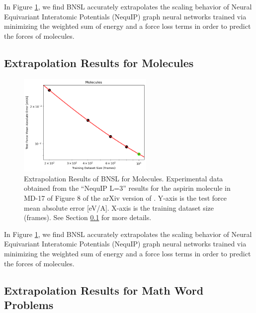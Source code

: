 \documentclass{article} %
\begin{document}
In Figure \ref{fig:molecules}, we find BNSL accurately extrapolates the scaling behavior of Neural Equivariant Interatomic Potentials (NequIP) graph neural networks \citep{Batzner_2022} trained via minimizing the weighted sum of energy and a force loss terms in order to predict the forces of molecules. 
\fi

\subsection{Extrapolation Results for Molecules}
\label{section:molecules}

\begin{figure}[htbp]
    \centering
\includegraphics[width=0.58\textwidth]{figures/molecules/molecules.png}
    \caption{
Extrapolation Results of BNSL for Molecules. Experimental data obtained from the ``NequIP L=3'' results for the aspirin molecule in MD-17 of Figure 8 of the arXiv version of \cite{Batzner_2022}. Y-axis is the test force mean absolute error [eV/A]. X-axis is the training dataset size (frames). See Section \ref{section:molecules} for more details.
    }
    \label{fig:molecules}
\end{figure}

In Figure \ref{fig:molecules}, we find BNSL accurately extrapolates the scaling behavior of Neural Equivariant Interatomic Potentials (NequIP) graph neural networks \citep{Batzner_2022} trained via minimizing the weighted sum of energy and a force loss terms in order to predict the forces of molecules. 


\clearpage

\subsection{Extrapolation Results for Math Word Problems}
\label{section:math_word_problems}
\end{document}
